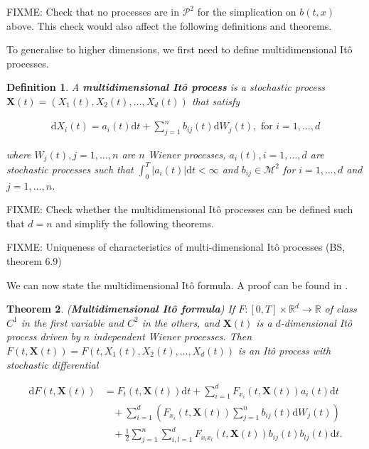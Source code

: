 \documentclass[a4paper]{article}
\newtheorem{definition}{Definition}[section]
\newtheorem{theorem}[definition]{Theorem}
\begin{document}
FIXME: Check that no processes are in $\mathcal{P}^2$ for the simplication on $b(t,x)$ above. This check would also affect the following definitions and theorems.


To generalise to higher dimensions, we first need to define multidimensional It\^o processes.

\begin{definition}
  A \textbf{multidimensional It\^o process} is a stochastic process $\mathbf{X}(t) = (X_1(t), X_2(t), \ldots, X_d(t))$ that satisfy

  \begin{align*}
    \mathrm{d}X_i(t) = a_i(t) \mathrm{d}t + \sum_{j=1}^n b_{ij}(t) \mathrm{d}W_j(t), \text{ for } i=1,\ldots,d
  \end{align*}

  where $W_j(t), j=1,\ldots,n$ are $n$ Wiener processes, $a_i(t), i=1,\ldots,d$ are stochastic processes such that $\int_0^T |a_i(t)| \mathrm{d}t < \infty$ and $b_{ij} \in \mathcal{M}^2$ for $i=1,\ldots,d$ and $j=1,\ldots,n$.
\end{definition}

FIXME: Check whether the multidimensional It\^o processes can be defined such that $d=n$ and simplify the following theorems.

FIXME: Uniqueness of characteristics of multi-dimensional It\^o processes (BS, theorem 6.9)

We can now state the multidimensional It\^o formula. A proof can be found in \textcite{capinski_blackscholes_2012}.

\begin{theorem}\label{eq:ito-formula-multi}
  (\textbf{Multidimensional It\^o formula}) If $F : [0,T] \times \mathbb{R}^d \to \mathbb{R}$ of class $C^1$ in the first variable and $C^2$ in the others, and $\mathbf{X}(t)$ is a $d$-dimensional It\^o process driven by $n$ independent Wiener processes. Then $F(t,\mathbf{X}(t)) = F(t,X_1(t),X_2(t),\ldots,X_d(t))$ is an It\^o process with stochastic differential

  \begin{align*}
    \mathrm{d}F(t,\mathbf{X}(t))
    &= F_t(t,\mathbf{X}(t)) \mathrm{d}t + \sum_{i=1}^d F_{x_i}(t,\mathbf{X}(t)) a_i(t) \mathrm{d}t\\
    &\ \ \ \ + \sum_{i=1}^d \left(F_{x_i}(t,\mathbf{X}(t)) \sum_{j=1}^n b_{ij}(t) \mathrm{d}W_j(t) \right)\\
    &\ \ \ \ + \frac{1}{2} \sum_{j=1}^n \sum_{i,l=1}^d F_{x_i x_l}(t,\mathbf{X}(t)) b_{ij}(t)b_{lj}(t) \mathrm{d}t.
  \end{align*}
\end{theorem}
\end{document}
